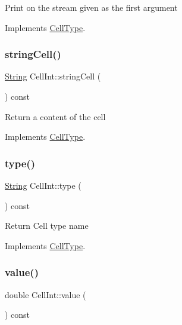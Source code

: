 Print on the stream given as the first argument 

Implements \hyperlink{class_cell_type_a34413fcb76f292b6b8d08615765ba894}{Cell\+Type}.

\mbox{\label{class_cell_int_ae6b32857bc96f305fff4226c988032d4}} 
\subsubsection{\texorpdfstring{string\+Cell()}{stringCell()}}
{\footnotesize\ttfamily \hyperlink{class_string}{String} Cell\+Int\+::string\+Cell (\begin{DoxyParamCaption}{ }\end{DoxyParamCaption}) const\hspace{0.3cm}{\ttfamily [virtual]}}

Return a content of the cell 

Implements \hyperlink{class_cell_type_abba4d6d43efa340144d1ad09637e1aa9}{Cell\+Type}.

\mbox{\label{class_cell_int_a65c7fa9731cc6f5b40579f314ba090dd}} 
\subsubsection{\texorpdfstring{type()}{type()}}
{\footnotesize\ttfamily \hyperlink{class_string}{String} Cell\+Int\+::type (\begin{DoxyParamCaption}{ }\end{DoxyParamCaption}) const\hspace{0.3cm}{\ttfamily [virtual]}}

Return Cell type name 

Implements \hyperlink{class_cell_type_ae31acfe1efc7776796d85918886247af}{Cell\+Type}.

\mbox{\label{class_cell_int_a1be32d235fbcc58483948770fb7ce9c6}} 
\subsubsection{\texorpdfstring{value()}{value()}}
{\footnotesize\ttfamily double Cell\+Int\+::value (\begin{DoxyParamCaption}{ }\end{DoxyParamCaption}) const\hspace{0.3cm}{\ttfamily [virtual]}}

